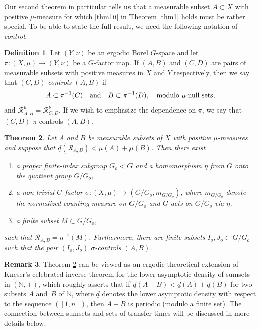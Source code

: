 \documentclass[JEP,XML,SOM,Unicode]{cedram}
\let\mathcal\mathscr
\newcommand{\cR}{\mathcal{R}}
\newcommand{\bN}{\mathbb{N}}
\newcommand{\qand}{\quad\textup{and}\quad}
\theoremstyle{plain}
\newtheorem{theorem}{Theorem}[section]
\theoremstyle{definition}
\newtheorem{definition}[theorem]{Definition}
\newtheorem{remark}[theorem]{Remark}
\begin{document}
Our second theorem in particular tells us that a measurable subset $A \subset X$ with positive $\mu$-measure for which \eqref{thm1ii} in Theorem \ref{thm1} holds must be rather special. To be able to state the full result, we need the following notation of \emph{control}.

\begin{definition}
Let $(Y,\nu)$ be an ergodic Borel $G$-space and let $\pi : (X,\mu) \to (Y,\nu)$ be a $G$-factor map. If $(A,B)$ and $(C,D)$ are pairs of measurable
subsets with positive measures in $X$ and $Y$ respectively, then we say that $(C,D)$ \emph{controls $(A,B)$} if
\[
A \subset \pi^{-1}(C) \qand B \subset \pi^{-1}(D), \quad \textrm{modulo $\mu$-null sets},
\]
and $\cR^\mu_{A,B} = \cR^\nu_{C,D}$. If we wish to emphasize the dependence on $\pi$, we say that $(C,D)$ $\pi$-controls $(A,B)$.
\end{definition}

\begin{theorem}									
\label{thm2}
Let $A$ and $B$ be measurable subsets of $X$ with positive $\mu$-measures and suppose that $\underline{d}(\cR_{A,B}) < \mu(A) + \mu(B)$. Then there exist

\begin{enumerate}
\item
a proper finite-index subgroup $G_o < G$ and a homomorphism $\eta$ from $G$ onto the quotient group $G/G_o$,
\item
a non-trivial $G$-factor $\sigma : (X,\mu) \to (G/G_o,m_{G/G_o})$, where $m_{G/G_o}$ denote the normalized
counting measure on $G/G_o$ and $G$ acts on $G/G_o$ via $\eta$,
\item
a finite subset $M \subset G/G_o$,
\end{enumerate}
such that $\cR_{A,B} = \eta^{-1}(M)$. Furthermore, there are finite subsets $I_o, J_o \subset G/G_o$ such that
the pair $(I_o,J_o)$ $\sigma$-controls $(A,B)$.
\end{theorem}

\begin{remark}
Theorem \ref{thm2} can be viewed as an ergodic-theoretical extension of Kneser's celebrated inverse theorem \cite{Kneser0} for the lower asymptotic density of sumsets in $(\bN,+)$, which roughly asserts that if $\underline{d}(A+B) < \underline{d}(A) + \underline{d}(B)$ for two subsets $A$ and~$B$
of $\bN$, where $\underline{d}$ denotes the lower asymptotic density with respect to the sequence $([1,n])$, then $A+B$ is periodic (modulo a finite set).
The connection between sumsets and sets of transfer times will be discussed in more details below.
\end{remark}
\end{document}
